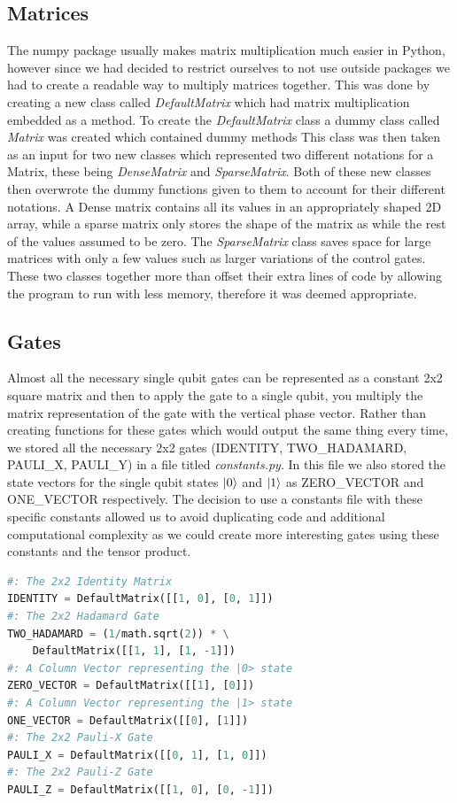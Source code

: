 \documentclass{article}
\begin{document}
\subsection{Matrices}
The numpy package usually makes matrix multiplication much easier in Python, however since we had decided to restrict ourselves to not use outside packages we had to create a readable way to multiply matrices together. This was done by creating a new class called \textit{DefaultMatrix} which had matrix multiplication embedded as a method. To create the \textit{DefaultMatrix} class a dummy class called \textit{Matrix} was created which contained dummy methods This class was then taken as an input for two new classes which represented two different notations for a Matrix, these being \textit{DenseMatrix} and \textit{SparseMatrix}. Both of these new classes then overwrote the dummy functions given to them to account for their different notations. A Dense matrix contains all its values in an appropriately shaped 2D array, while a sparse matrix only stores the shape of the matrix as while the rest of the values assumed to be zero. The \textit{SparseMatrix} class saves space for large matrices with only a few values such as larger variations of the control gates. These two classes together more than offset their extra lines of code by allowing the program to run with less memory, therefore it was deemed appropriate. 

\subsection{Gates}
Almost all the necessary single qubit gates can be represented as a constant 2x2 square matrix and then to apply the gate to a single qubit, you multiply the matrix representation of the gate with the vertical phase vector. Rather than creating functions for these gates which would output the same thing every time, we stored all the necessary 2x2 gates (IDENTITY, TWO\_HADAMARD, PAULI\_X, PAULI\_Y) in a file titled \textit{constants.py}. In this file we also stored the state vectors for the single qubit states $\ket{0}$ and $\ket{1}$ as ZERO\_VECTOR and ONE\_VECTOR respectively. 
The decision to use a constants file with these specific constants allowed us to avoid duplicating code and additional computational complexity as we could create more interesting gates using these constants and the tensor product.

\begin{file}[constants.py]
\begin{lstlisting}[language=Python]
#: The 2x2 Identity Matrix
IDENTITY = DefaultMatrix([[1, 0], [0, 1]])
#: The 2x2 Hadamard Gate
TWO_HADAMARD = (1/math.sqrt(2)) * \
	DefaultMatrix([[1, 1], [1, -1]])
#: A Column Vector representing the |0> state
ZERO_VECTOR = DefaultMatrix([[1], [0]])
#: A Column Vector representing the |1> state
ONE_VECTOR = DefaultMatrix([[0], [1]])
#: The 2x2 Pauli-X Gate
PAULI_X = DefaultMatrix([[0, 1], [1, 0]])
#: The 2x2 Pauli-Z Gate
PAULI_Z = DefaultMatrix([[1, 0], [0, -1]])

\end{lstlisting}
\end{file}
\end{document}
